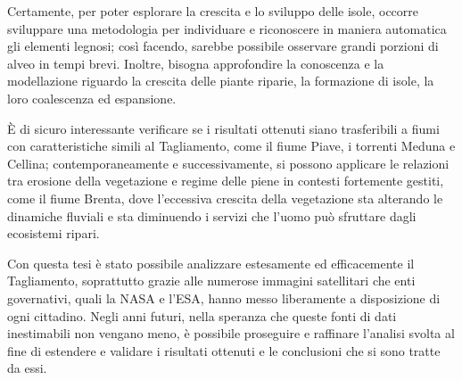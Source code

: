 Certamente, per poter esplorare la crescita e lo sviluppo delle isole, occorre sviluppare una metodologia per individuare e riconoscere in maniera automatica gli elementi legnosi; così facendo, sarebbe possibile osservare grandi porzioni di alveo in tempi brevi.
Inoltre, bisogna approfondire la conoscenza e la modellazione riguardo la crescita delle piante riparie, la formazione di isole, la loro coalescenza ed espansione.

È di sicuro interessante verificare se i risultati ottenuti siano trasferibili a fiumi con caratteristiche simili al Tagliamento, come il fiume Piave, i torrenti Meduna e Cellina; contemporaneamente e successivamente, si possono applicare le relazioni tra erosione della vegetazione e regime delle piene in contesti fortemente gestiti, come il fiume Brenta, dove l'eccessiva crescita della vegetazione sta alterando le dinamiche fluviali e sta diminuendo i servizi che l'uomo può sfruttare dagli ecosistemi ripari.

Con questa tesi è stato possibile analizzare estesamente ed efficacemente il Tagliamento, soprattutto grazie alle numerose immagini satellitari che enti governativi, quali la NASA e l'ESA, hanno messo liberamente a disposizione di ogni cittadino.
Negli anni futuri, nella speranza che queste fonti di dati inestimabili non vengano meno, è possibile proseguire e raffinare l'analisi svolta al fine di estendere e validare i risultati ottenuti e le conclusioni che si sono tratte da essi.
